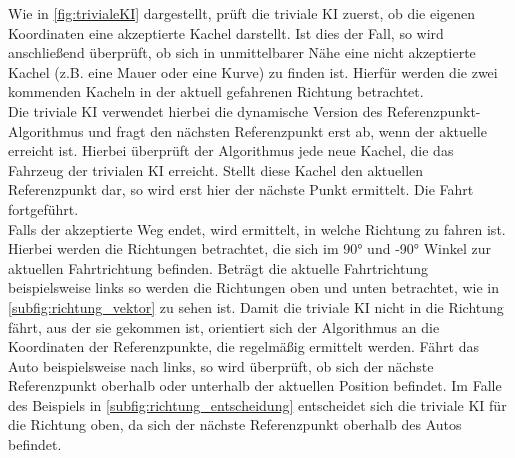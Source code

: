 Wie in \autoref{fig:trivialeKI} dargestellt, prüft die triviale KI zuerst, ob die eigenen Koordinaten eine akzeptierte Kachel darstellt. Ist dies der Fall, so wird anschließend überprüft, ob sich in unmittelbarer Nähe eine nicht akzeptierte Kachel (z.B. eine Mauer oder eine Kurve) zu finden ist. Hierfür werden die zwei kommenden Kacheln in der aktuell gefahrenen Richtung betrachtet.\\
Die triviale KI verwendet hierbei die dynamische Version des Referenzpunkt-Algorithmus und fragt den nächsten Referenzpunkt erst ab, wenn der aktuelle erreicht ist. Hierbei überprüft der Algorithmus jede neue Kachel, die das Fahrzeug der trivialen KI erreicht. Stellt diese Kachel den aktuellen Referenzpunkt dar, so wird erst hier der nächste Punkt ermittelt. Die Fahrt fortgeführt.\\
Falls der akzeptierte Weg endet, wird ermittelt, in welche Richtung zu fahren ist. Hierbei werden die Richtungen betrachtet, die sich im 90° und -90° Winkel zur aktuellen Fahrtrichtung befinden. Beträgt die aktuelle Fahrtrichtung beispielsweise \glqq links\grqq{} so werden die Richtungen \glqq oben\grqq{} und \glqq unten\grqq{} betrachtet, wie in \autoref{subfig:richtung_vektor} zu sehen ist. Damit die triviale KI nicht in die Richtung fährt, aus der sie gekommen ist, orientiert sich der Algorithmus an die Koordinaten der Referenzpunkte, die regelmäßig ermittelt werden. Fährt das Auto beispielsweise nach links, so wird überprüft, ob sich der nächste Referenzpunkt oberhalb oder unterhalb der aktuellen Position befindet. Im Falle des Beispiels in \autoref{subfig:richtung_entscheidung} entscheidet sich die triviale KI für die Richtung \glqq oben\grqq{}, da sich der nächste Referenzpunkt oberhalb des Autos befindet.\\
